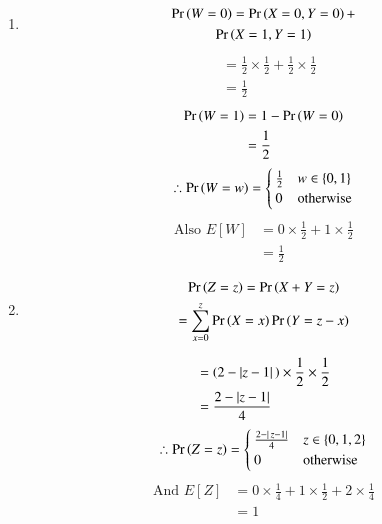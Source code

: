 \documentclass[journal,12pt,twocolumn]{IEEEtran}
\begin{document}
 \begin{enumerate}[label=\alph*)]
\item
\begin{multline}
        \Pr\left(W=0\right) = \Pr\left(X=0,Y=0\right)+\\\Pr\left(X=1,Y=1\right)
\end{multline}
\begin{align}
        &= \frac{1}{2}\times\frac{1}{2} + \frac{1}{2}\times\frac{1}{2}\\
        &= \frac{1}{2}
 \end{align}
 \begin{align}
     \Pr\left(W=1\right) &= 1- \Pr\left(W=0\right)\\
              &= \frac{1}{2}
 \end{align}
 \begin{equation}
  \therefore \Pr\left(W=w\right) =
    \begin{cases}
      \frac{1}{2} & w \in \left\{0,1\right\}\\
      0 & \text{otherwise}
    \end{cases}       
\end{equation}
\begin{align}
   \text{Also }E[W] &= 0\times\frac{1}{2} + 1\times\frac{1}{2}\\
                    &= \frac{1}{2} 
\end{align}
 \item
 \begin{multline}
     \Pr\left(Z=z\right) =\Pr\left(X+Y =z\right)\\
              =\sum_{x=0}^z\Pr\left(X=x\right)\Pr\left(Y=z-x\right)
 \end{multline}
 
\begin{align}
          &=\left(2-\vert z-1\vert\,\right)\times\frac{1}{2}\times\frac{1}{2}\\
          &= \frac{2-\vert z-1\vert}{4}
\end{align}
\begin{equation}
  \therefore \Pr\left(Z=z\right) =
    \begin{cases}
       \frac{2-\vert\,z-1\vert}{4} & z \in \left\{0,1,2\right\}\\
      0 & \text{otherwise}
    \end{cases}       
\end{equation}
\begin{align}
    \text{And } E[Z] &= 0\times\frac{1}{4} + 1\times\frac{1}{2} + 2\times\frac{1}{4}\\
                     &= 1
\end{align}
\end{enumerate}
\end{document}
